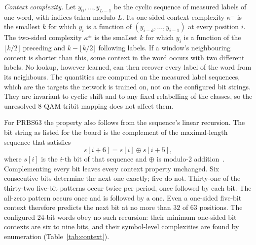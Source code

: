 \documentclass{ieeeaccess}
\begin{document}
\emph{Context complexity.} Let $y_0,\dots,y_{L-1}$ be the cyclic sequence of
measured labels of one word, with indices taken modulo $L$. Its one-sided
context complexity $\kappa^{-}$ is the smallest $k$ for which $y_i$ is a
function of $(y_{i-k},\dots,y_{i-1})$ at every position $i$. The two-sided
complexity $\kappa^{\pm}$ is the smallest $k$ for which $y_i$ is a function of
the $\lfloor k/2\rfloor$ preceding and $k-\lfloor k/2\rfloor$ following labels.
If a window's neighbouring content is shorter than this, some context in the
word occurs with two different labels. No lookup, however learned, can then
recover every label of the word from its neighbours. The quantities are
computed on the measured label sequences, which are the targets the network is
trained on, not on the configured bit strings. They are invariant to cyclic
shift and to any fixed relabelling of the classes, so the unresolved 8-QAM
tribit mapping does not affect them.

For PRBS63 the property also follows from the sequence's linear recursion. The
bit string as listed for the board is the complement of the maximal-length
sequence that satisfies
\begin{equation}
s[i+6] = s[i] \oplus s[i+5],
\label{eq:lfsr}
\end{equation}
where $s[i]$ is the $i$-th bit of that sequence and $\oplus$ is modulo-2
addition~\cite{golomb1982shift}. Complementing every bit leaves every context
property unchanged. Six consecutive bits determine the next one exactly; five
do not. Thirty-one of the thirty-two five-bit patterns occur twice per period,
once followed by each bit. The all-zero pattern occurs once and is followed by
a one. Even a one-sided five-bit context therefore predicts the next bit at no
more than $32$ of $63$ positions. The configured 24-bit words obey no such
recursion: their minimum one-sided bit contexts are six to nine bits, and their
symbol-level complexities are found by enumeration (Table~\ref{tab:context}).
\end{document}
